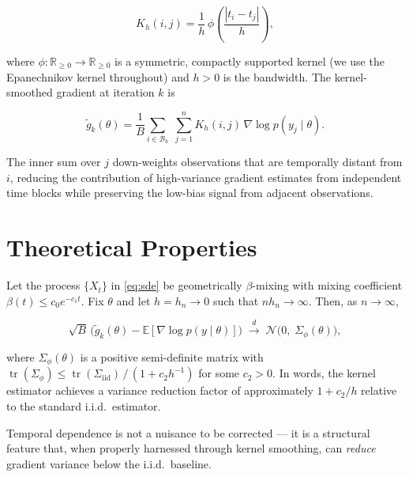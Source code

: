 \documentclass[12pt,letterpaper,twoside]{report}
\begin{document}
\begin{equation}\label{eq:kernel}
K_{h}(i, j) = \frac{1}{h}\,\phi\!\left(\frac{|t_{i} - t_{j}|}{h}\right),
\end{equation}

\noindent where $\phi: \mathbb{R}_{\ge 0} \to \mathbb{R}_{\ge 0}$ is a symmetric, compactly supported kernel (we use the Epanechnikov kernel throughout) and $h > 0$ is the bandwidth. The kernel-smoothed gradient at iteration $k$ is

\begin{equation}\label{eq:kgrad}
\tilde{g}_{k}(\theta) = \frac{1}{B}\sum_{i \in \mathcal{B}_{k}}\;\sum_{j=1}^{n} K_{h}(i, j)\,\nabla\log p(y_{j}\mid\theta).
\end{equation}

The inner sum over $j$ down-weights observations that are temporally distant from $i$, reducing the contribution of high-variance gradient estimates from independent time blocks while preserving the low-bias signal from adjacent observations.

\section{Theoretical Properties}

\begin{theorembox}[title={Asymptotic Normality of $\tilde{g}_{k}$}]
Let the process $\{X_{t}\}$ in \eqref{eq:sde} be geometrically $\beta$-mixing with mixing coefficient $\beta(t) \le c_{0}e^{-c_{1}t}$. Fix $\theta$ and let $h = h_{n} \to 0$ such that $nh_{n} \to \infty$. Then, as $n \to \infty$,

\begin{equation}\label{eq:clt}
\sqrt{B}\,\bigl(\tilde{g}_{k}(\theta) - \mathbb{E}[\nabla\log p(y\mid\theta)]\bigr) \;\xrightarrow{d}\; \mathcal{N}\!\bigl(0,\; \Sigma_{\phi}(\theta)\bigr),
\end{equation}

\noindent where $\Sigma_{\phi}(\theta)$ is a positive semi-definite matrix with $\operatorname{tr}(\Sigma_{\phi}) \le \operatorname{tr}(\Sigma_{\mathrm{iid}})\,/\,(1 + c_{2}h^{-1})$ for some $c_{2} > 0$. In words, the kernel estimator achieves a variance reduction factor of approximately $1 + c_{2}/h$ relative to the standard i.i.d.\ estimator.
\end{theorembox}

\vspace{6pt}

\begin{center}
\begin{minipage}{0.48\textwidth}
\begin{tcolorbox}[colback=ChicagoMaroon!6,colframe=ChicagoMaroon!50,arc=5pt,boxrule=0.6pt,title={\textbf{Key insight}},fonttitle=\bfseries\color{ChicagoMaroon}]
Temporal dependence is not a nuisance to be corrected --- it is a structural feature that, when properly harnessed through kernel smoothing, can \textit{reduce} gradient variance below the i.i.d.\ baseline.
\end{tcolorbox}
\end{minipage}
\end{center}
\end{document}
